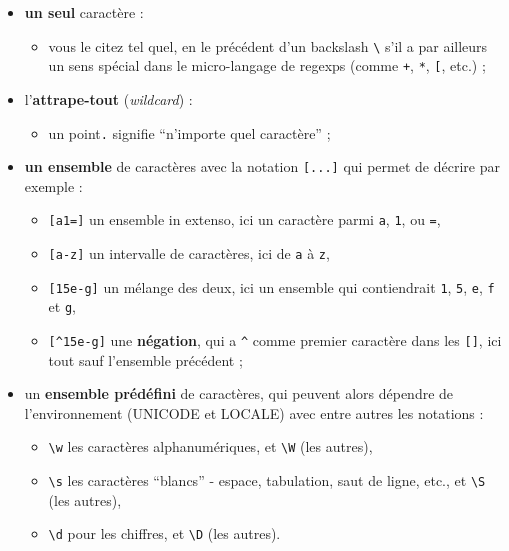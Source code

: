\begin{itemize}
	\item 	  
	\textbf{un seul} caractère :
	\begin{itemize}
		\item 
		vous le citez tel quel, en le précédent d'un backslash
		\texttt{\textbackslash{}} s'il a par ailleurs un sens spécial dans le
		micro-langage de regexps (comme \texttt{+}, \texttt{*}, \texttt{{[}},
		etc.) ;
	\end{itemize}
		\item
		l'\textbf{attrape-tout} (\emph{wildcard}) :
		\begin{itemize}
			\item 
			un point\texttt{.} signifie ``n'importe quel caractère'' ;
	     \end{itemize}	
		\item
		\textbf{un ensemble} de caractères avec la notation \texttt{{[}...{]}} qui permet
		de décrire par exemple :
		\begin{itemize}
			\item 
			\texttt{{[}a1={]}} un ensemble in extenso,
			ici un caractère parmi \texttt{a}, \texttt{1}, ou \texttt{=},
			\item
			\texttt{{[}a-z{]}} un intervalle de caractères, ici de \texttt{a} à
			\texttt{z},
			\item
			\texttt{{[}15e-g{]}} un mélange des deux, ici un ensemble
			qui contiendrait \texttt{1}, \texttt{5}, \texttt{e}, \texttt{f} et
			\texttt{g},
			\item
			\texttt{{[}\^{}15e-g{]}} une \textbf{négation}, qui a
			\texttt{\^{}} comme premier caractère dans les \texttt{{[}{]}}, ici tout
			sauf l'ensemble précédent ;
		 \end{itemize}
		\item
		un \textbf{ensemble prédéfini} de
		caractères, qui peuvent alors dépendre de l'environnement (UNICODE et
		LOCALE) avec entre autres les notations :
		\begin{itemize}
			\item 
			\texttt{\textbackslash{}w}
			les caractères alphanumériques, et \texttt{\textbackslash{}W} (les
			autres),
			\item
			\texttt{\textbackslash{}s} les caractères ``blancs'' -
			espace, tabulation, saut de ligne, etc., et \texttt{\textbackslash{}S}
			(les autres),
			\item
			\texttt{\textbackslash{}d} pour les chiffres, et
			\texttt{\textbackslash{}D} (les autres).
		\end{itemize}
\end{itemize}

